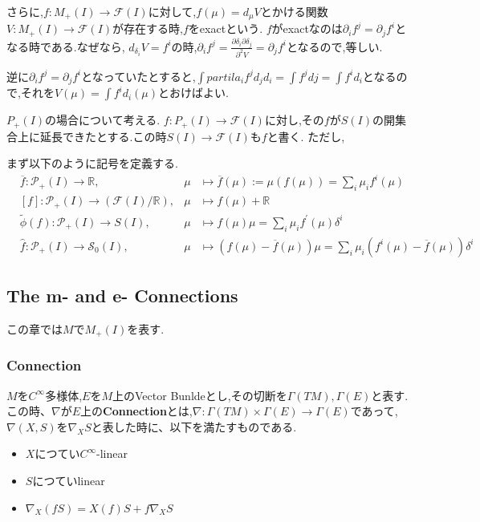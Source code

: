 \documentclass[dvipdfmx]{ujarticle}
\begin{document}
さらに,$f: M_+(I) \to \mathcal{F}(I)$に対して,$f(\mu) = d_{\mu}V$とかける関数$V: M_+(I) \to \mathcal{F}(I)$が存在する時,$f$をexactという.
$f$がexactなのは$\partial_i f^j = \partial_j f^i$となる時である.なぜなら,
$d_{\delta_i}V = f^i$の時,$\partial_i f^j = \frac{\partial \delta_i \partial \delta_j}{\partial^2 V} = \partial_j f^i$となるので,等しい.

逆に$\partial_i f^j = \partial_j f^i$となっていたとすると,$\int partila_i f^j d_j d_i = \int f^j dj = \int f^i d_i$となるので,それを$V(\mu) = \int f^i d_i (\mu)$とおけばよい.

$P_{+}(I)$の場合について考える.
$f: P_{+}(I) \to \mathcal{F}(I)$に対し,その$f$が$S(I)$の開集合上に延長できたとする.この時$S(I) \to \mathcal{F}(I)$も$f$と書く.
ただし,

まず以下のように記号を定義する.
$$
\begin{aligned}
  & \overline{f} : \mathcal{P}_{+}(I) \rightarrow \mathbb{R}, & \mu &\mapsto \overline{f}(\mu) :=\mu(f(\mu))=\sum_{i} \mu_{i} f^{i}(\mu) \\
  & [f] : \mathcal{P}_{+}(I) \rightarrow(\mathcal{F}(I) / \mathbb{R}), & \mu &\mapsto f(\mu)+\mathbb{R} \\
  & \tilde{\phi}(f) : \mathcal{P}_{+}(I) \rightarrow S(I), & \mu &\mapsto f(\mu) \mu=\sum_{i} \mu_{i} f^{\prime}(\mu) \delta^{i} \\
  & \hat{f} : \mathcal{P}_{+}(I) \rightarrow \mathcal{S}_{0}(I), & \mu &\mapsto(f(\mu)-\overline{f}(\mu)) \mu=\sum_{i} \mu_{i}\left(f^{i}(\mu)-\overline{f}(\mu)\right) \delta^{i}
\end{aligned}
$$

\subsection{The m- and e- Connections}
この章では$M$で$M_+(I)$を表す.

\subsubsection{Connection}
\begin{screen}
\begin{dfn}
$M$を$C^{\infty}$多様体,$E$を$M$上のVector Bunldeとし,その切断を$\Gamma(TM), \Gamma(E)$と表す.
この時、$\nabla$が$E$上の\textbf{Connection}とは,$\nabla: \Gamma(TM) \times \Gamma(E) \to \Gamma(E)$であって,
$\nabla(X, S)$を$\nabla_XS$と表した時に、以下を満たすものである.

\begin{itemize}
 \item $X$につてい$C^{\infty}$-linear
 \item $S$につていlinear
 \item $\nabla_X(fS) = X(f)S + f\nabla_XS$
\end{itemize}
\end{dfn}
\end{screen}
\end{document}
